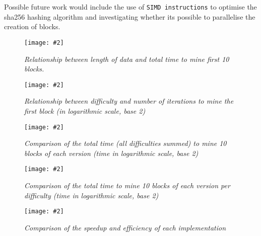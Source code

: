 \documentclass[12pt, a4paper]{article}
\newcommand{\figuremacro}[5]{
    \begin{figure}[#1]
        \centering
        \caption[#3]{\textbf{#3}#4}
        \texttt{[image: \#2]}
        \label{fig:#2}
    \end{figure}
}
\begin{document}
    Possible future work would include the use of \texttt{SIMD instructions} to optimise the sha256 hashing algorithm and investigating whether its possible to parallelise the creation of blocks.

    
    		
    
    \figuremacro{h}{datalen_chart}{}{\small{\textit{Relationship between length of data and total time to mine first 10 blocks.}}}{1}

    \figuremacro{h}{iterations}{}{\small{\textit{Relationship between difficulty and number of iterations to mine the first block (in logarithmic scale, base 2)}}}{1}

    \figuremacro{h}{total_time}{}{\small{\textit{Comparison of the total time (all difficulties summed) to mine 10 blocks of each version (time in logarithmic scale, base 2)}}}{1}

    \figuremacro{h}{diff_time}{}{\small{\textit{Comparison of the total time to mine 10 blocks of each version per difficulty (time in logarithmic scale, base 2)}}}{1}

    \figuremacro{h}{su_eff}{}{\small{\textit{Comparison of the speedup and efficiency of each implementation}}}{1}
\end{document}
